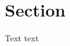 \documentclass{article}
\begin{document}
\section{Section}
Text \cite{knuth_fa} text

\printbibliography
\end{document}
